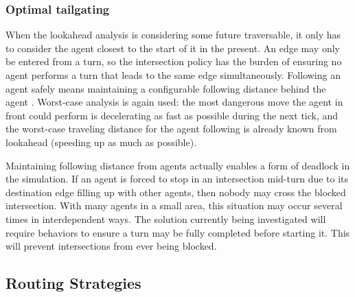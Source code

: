\documentclass[letterpaper, 10 pt, conference]{ieeeconf}  %
\begin{document}
 

\subsubsection{Optimal tailgating}


When the lookahead analysis is considering some future traversable, it only has
to consider the agent closest to the start of it in the present. An edge may
only be entered from a turn, so the intersection policy has the burden of
ensuring no agent performs a turn that leads to the same edge simultaneously.
Following an agent safely means maintaining a configurable following distance
behind the agent . Worst-case analysis is again used: the most dangerous move the
agent in front could perform is decelerating as fast as possible
during the next tick,
and the worst-case traveling distance for the agent following is already known
from lookahead (speeding up as much as possible).

Maintaining following distance from agents actually enables a form of deadlock
in the simulation. If an agent is forced to stop in an intersection mid-turn due
to its destination edge filling up with other agents, then nobody may cross the
blocked intersection. With many agents in a small area, this situation may
occur several times in interdependent ways. The solution currently being
investigated will require behaviors to ensure a turn may be fully completed
before starting it. This will prevent intersections from ever being blocked.

\commentp{Cite (and ideally use ideas from) paper commented out in latex file
}


\subsection{Routing Strategies}
\end{document}
